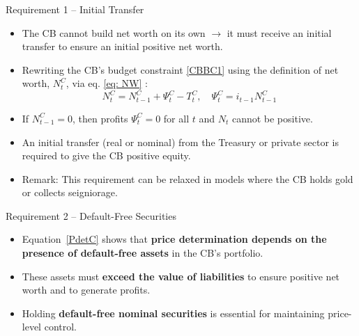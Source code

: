 \documentclass[11pt,aspectratio=169]{beamer}
\begin{document}
\begin{frame}{Requirement 1 -- Initial Transfer}
\begin{itemize}
    \item The CB cannot build net worth on its own $\rightarrow$ it must receive an initial transfer to ensure an initial positive net worth.
    \vspace{0.25cm}
    \item Rewriting the CB's budget constraint \eqref{CBBC1} using the definition of net worth, $N_t^C$, via eq. \eqref{eq: NW} :
    \[
    N_t^C = N_{t-1}^C + \Psi_t^C - T_t^C, 
    \quad \Psi_t^C = i_{t-1} N_{t-1}^C
    \]
    \vspace{0.25cm}
    \item If $N_{t-1}^C = 0$, then profits $\Psi_t^C = 0$ for all $t$ and $N_{t}$ cannot be positive.
    \vspace{0.25cm}
    \item  An initial transfer (real or nominal) from the Treasury or private sector is required to give the CB positive equity.
    \vspace{0.25cm}
    \item Remark: 
    This requirement can be relaxed in models where the CB holds gold or collects seigniorage.
\end{itemize}
\end{frame}

\begin{frame}{Requirement 2 – Default-Free Securities}


\begin{itemize}
  \item Equation~\eqref{PdetC} shows that \textbf{price determination depends on the presence of default-free assets} in the CB’s portfolio.

  \vspace{0.25cm}
  \item These assets must \textbf{exceed the value of liabilities} to ensure positive net worth and to generate profits.

  \vspace{0.25cm}
  \item Holding \textbf{default-free nominal securities} is essential for maintaining price-level control.
\end{itemize}

\end{frame}
\end{document}
